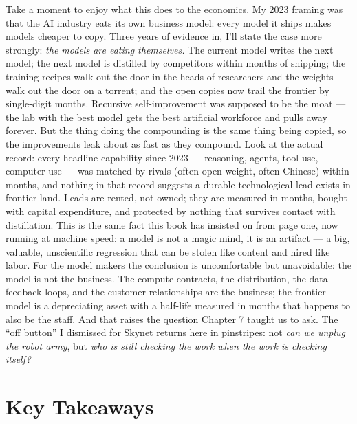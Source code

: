 Take a moment to enjoy what this does to the economics. My 2023 framing was that the AI industry eats its own business model: every model it ships makes models cheaper to copy. Three years of evidence in, I'll state the case more strongly: \textit{the models are eating themselves.} The current model writes the next model; the next model is distilled by competitors within months of shipping; the training recipes walk out the door in the heads of researchers and the weights walk out the door on a torrent; and the open copies now trail the frontier by single-digit months. Recursive self-improvement was supposed to be the moat --- the lab with the best model gets the best artificial workforce and pulls away forever. But the thing doing the compounding is the same thing being copied, so the improvements leak about as fast as they compound. Look at the actual record: every headline capability since 2023 --- reasoning, agents, tool use, computer use --- was matched by rivals (often open-weight, often Chinese) within months, and nothing in that record suggests a durable technological lead exists in frontier land. Leads are rented, not owned; they are measured in months, bought with capital expenditure, and protected by nothing that survives contact with distillation. This is the same fact this book has insisted on from page one, now running at machine speed: a model is not a magic mind, it is an artifact --- a big, valuable, unscientific regression that can be stolen like content and hired like labor. For the model makers the conclusion is uncomfortable but unavoidable: the model is not the business. The compute contracts, the distribution, the data feedback loops, and the customer relationships are the business; the frontier model is a depreciating asset with a half-life measured in months that happens to also be the staff. And that raises the question Chapter 7 taught us to ask. The ``off button'' I dismissed for Skynet returns here in pinstripes: not \textit{can we unplug the robot army}, but \textit{who is still checking the work when the work is checking itself?}

\section{Key Takeaways}

